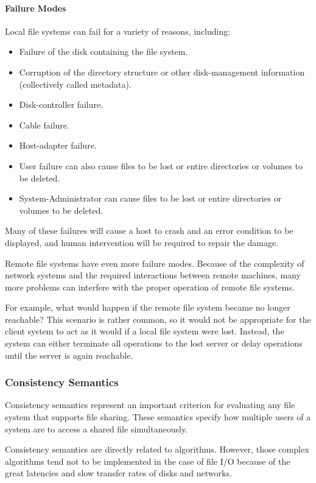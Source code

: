 \paragraph{Failure Modes}\label{par:Failure_Modes}
Local file systems can fail for a variety of reasons, including:
\begin{itemize}[noitemsep]
\item Failure of the disk containing the file system.
\item Corruption of the directory structure or other disk-management information (collectively called metadata).
\item Disk-controller failure.
\item Cable failure.
\item Host-adapter failure.
\item User failure can also cause files to be lost or entire directories or volumes to be deleted.
\item System-Administrator can cause files to be lost or entire directories or volumes to be deleted.
\end{itemize}

Many of these failures will cause a host to crash and an error condition to be displayed, and human intervention will be required to repair the damage.

Remote file systems have even more failure modes.
Because of the complexity of network systems and the required interactions between remote machines, many more problems can interfere with the proper operation of remote file systems.

For example, what would happen if the remote file system became no longer reachable?
This scenario is rather common, so it would not be appropriate for the client system to act as it would if a local file system were lost.
Instead, the system can either terminate all operations to the lost server or delay operations until the server is again reachable.

\subsubsection{Consistency Semantics}\label{subsubsec:Consistency_Semantics}
Consistency semantics represent an important criterion for evaluating any file system that supports file sharing.
These semantics specify how multiple users of a system are to access a shared file simultaneously.

Consistency semantics are directly related to   algorithms.
However, those complex algorithms tend not to be implemented in the case of file I/O because of the great latencies and slow transfer rates of disks and networks.

